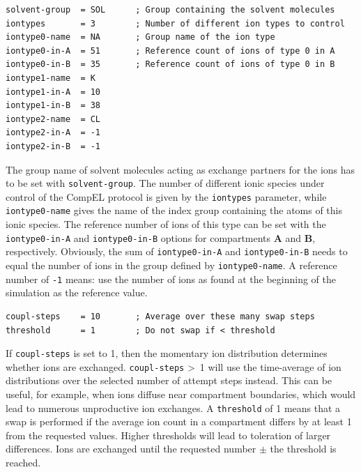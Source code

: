 {\small
\begin{verbatim}
solvent-group  = SOL      ; Group containing the solvent molecules
iontypes       = 3        ; Number of different ion types to control
iontype0-name  = NA       ; Group name of the ion type
iontype0-in-A  = 51       ; Reference count of ions of type 0 in A
iontype0-in-B  = 35       ; Reference count of ions of type 0 in B
iontype1-name  = K
iontype1-in-A  = 10
iontype1-in-B  = 38
iontype2-name  = CL
iontype2-in-A  = -1
iontype2-in-B  = -1
\end{verbatim}}
The group name of solvent molecules acting as exchange partners for the ions
has to be set with {\tt solvent-group}. The number of different ionic species under
control of the CompEL protocol is given by the {\tt iontypes} parameter,
while {\tt iontype0-name} gives the name of the index group containing the
atoms of this ionic species. The reference number of ions of this type 
can be set with the {\tt iontype0-in-A} and {\tt iontype0-in-B} options
for compartments {\bf A} and {\bf B}, respectively. Obviously,
the sum of {\tt iontype0-in-A} and {\tt iontype0-in-B} needs to equal the number
of ions in the group defined by {\tt iontype0-name}.
A reference number of {\tt -1} means: use the number of ions as found at the beginning
of the simulation as the reference value.

{\small
\begin{verbatim}
coupl-steps    = 10       ; Average over these many swap steps
threshold      = 1        ; Do not swap if < threshold
\end{verbatim}}
If {\tt coupl-steps} is set to 1, then the momentary ion distribution determines
whether ions are exchanged. {\tt coupl-steps} \textgreater\ 1 will use the time-average
of ion distributions over the selected number of attempt steps instead. This can be useful, for example,
when ions diffuse near compartment boundaries, which would lead to numerous unproductive
ion exchanges. A {\tt threshold} of 1 means that a swap is performed if the average ion
count in a compartment differs by at least 1 from the requested values. Higher thresholds
will lead to toleration of larger differences. Ions are exchanged until the requested
number $\pm$ the threshold is reached.

